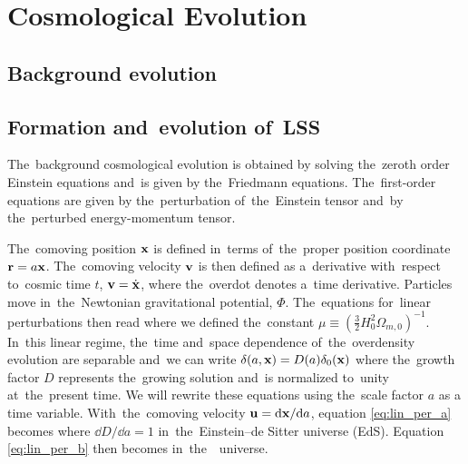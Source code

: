 \chapter{Cosmological Evolution}
\label{chpt:cosmo_evol}
\section{Background evolution}


% 

% 
\section{Formation and~evolution of~LSS}
The~background cosmological evolution is obtained by solving the~zeroth order Einstein equations and~is given by the~Friedmann equations. The~first-order equations are given by the~perturbation of~the~Einstein tensor and~by the~perturbed energy-momentum tensor.

The~comoving position $\mathbf x$ is defined in~terms of~the~proper position coordinate $\mathbf r = a\mathbf x$. The~comoving velocity $\mathbf v$ is then defined as a~derivative with~respect to~cosmic time $t$, $\mathbf v = \dot{\mathbf x}$, where the~overdot denotes a~time derivative. Particles move in~the~Newtonian gravitational potential, $\Phi$. The~equations for~linear perturbations then read  \parencite{2002col.luc..cosmology}
where we defined the~constant $\mu\equiv\left(\frac32 H_0^2\Omega_{m, 0}\right)^{-1}$. In~this linear regime, the~time and~space dependence of~the~overdensity evolution are separable and~we can write $\delta(a, \mathbf x)=D(a)\delta_0(\mathbf x)$ where the~growth factor $D$ represents the~growing solution and~is normalized to~unity at~the~present time. We will rewrite these equations using the~scale factor $a$ as a time variable. With~the~comoving velocity $\mathbf u = \mbox{d} \mathbf x/\mbox{d} a$, equation \eqref{eq:lin_per_a} becomes
where $\dd D/\dd a = 1$ in~the~Einstein--de Sitter universe (EdS). Equation \eqref{eq:lin_per_b} then becomes
in~the~\LCDM\ universe.



% 